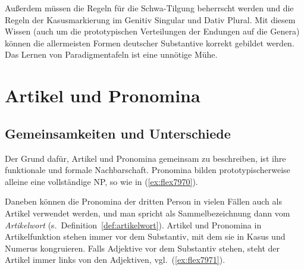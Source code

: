 Außerdem müssen die Regeln für die Schwa-Tilgung beherrscht werden und die Regeln der Kasusmarkierung im Genitiv Singular und Dativ Plural.
Mit diesem Wissen (auch um die prototypischen Verteilungen der Endungen auf die Genera) können die allermeisten Formen deutscher Substantive korrekt gebildet werden.
Das Lernen von Paradigmentafeln ist eine unnötige Mühe.




\section{Artikel und Pronomina}

\label{sec:artikelpronomen}

\subsection{Gemeinsamkeiten und Unterschiede}

Der Grund dafür, Artikel und Pronomina gemeinsam zu beschreiben, ist ihre funktionale und formale Nachbarschaft.
Pronomina bilden prototypischerweise alleine eine vollständige NP, so wie in (\ref{ex:flex7970}).

\begin{exe}
  \ex \label{ex:flex7970}
  \begin{xlist}
  \end{xlist}
\end{exe}

Daneben können die Pronomina der dritten Person in vielen Fällen auch als Artikel verwendet werden, und man spricht als Sammelbezeichnung dann vom \textit{Artikelwort} (s.\ Definition~\ref{def:artikelwort}).
Artikel und Pronomina in Artikelfunktion stehen immer vor dem Substantiv, mit dem sie in Kasus und Numerus kongruieren.
Falls Adjektive vor dem Substantiv stehen, steht der Artikel immer links von den Adjektiven, vgl.\ (\ref{ex:flex7971}).

